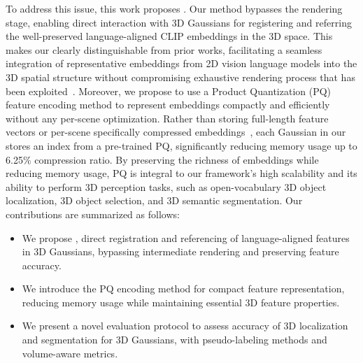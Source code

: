 To address this issue, this work proposes \nickname. Our method bypasses the rendering stage, enabling direct interaction with 3D Gaussians for registering and referring the well-preserved language-aligned CLIP embeddings in the 3D space. This makes our \nickname clearly distinguishable from prior works, facilitating a seamless integration of representative embeddings from 2D vision language models into the 3D spatial structure without compromising exhaustive rendering process that has been exploited~\cite{langsplat, legaussian, zhou2024feature, fastlgs, fmgs, gaussian_grasper}. Moreover, we propose to use a Product Quantization (PQ) feature encoding method to represent embeddings compactly and efficiently without any per-scene optimization. Rather than storing full-length feature vectors or per-scene specifically compressed embeddings~\cite{langsplat, legaussian, zhou2024feature, fastlgs, fmgs, gaussian_grasper}, each Gaussian in our \nickname stores an index from a pre-trained PQ, significantly reducing memory usage up to 6.25$\%$ compression ratio. 
By preserving the richness of embeddings while reducing memory usage, PQ is integral to our framework’s high scalability and its ability to perform 3D perception tasks, such as open-vocabulary 3D object localization, 3D object selection, and 3D semantic segmentation. Our contributions are summarized as follows:
\begin{itemize}
    \item We propose \nickname, direct registration and referencing of language-aligned features in 3D Gaussians, bypassing intermediate rendering and preserving feature accuracy.
    \item We introduce the PQ encoding method for compact feature representation, reducing memory usage while maintaining essential 3D feature properties.
    \item We present a novel evaluation protocol to assess accuracy of 3D localization and segmentation for 3D Gaussians, with pseudo-labeling methods and volume-aware metrics.
\end{itemize}
